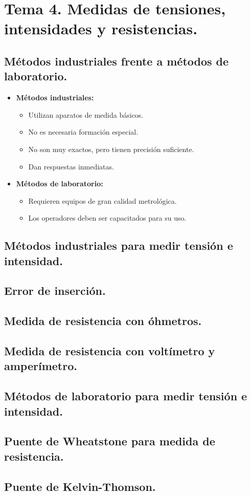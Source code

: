 \section{Tema 4. Medidas de tensiones, intensidades y resistencias.}
\subsection{Métodos industriales frente a métodos de laboratorio.}
\begin{itemize}
	\item \textbf{Métodos industriales:}
	\begin{itemize}
		\item Utilizan aparatos de medida básicos.
		\item No es necesaria formación especial.
		\item No son muy exactos, pero tienen precisión suficiente.
		\item Dan respuestas inmediatas.
	\end{itemize}
	\item \textbf{Métodos de laboratorio:}
	\begin{itemize}
		\item Requieren equipos de gran calidad metrológica.
		\item Los operadores deben ser capacitados para su uso.
	\end{itemize}
\end{itemize}


\subsection{Métodos industriales para medir tensión e intensidad.}

\subsection{Error de inserción.}
\subsection{Medida de resistencia con óhmetros.}
\subsection{Medida de resistencia con voltímetro y amperímetro.}
\subsection{Métodos de laboratorio para medir tensión e intensidad.}
\subsection{Puente de Wheatstone para medida de resistencia.}
\subsection{Puente de Kelvin-Thomson.}